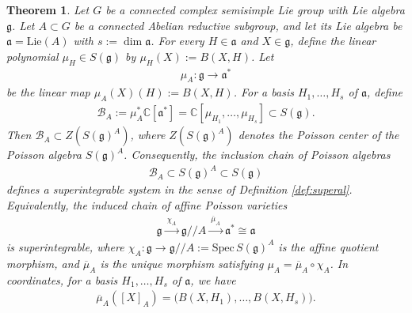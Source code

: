 \documentclass[11pt,reqno]{amsart}
\newtheorem*{theorem A}{Main Theorem A}
\newtheorem*{theorem B}{Main Theorem B}
\newtheorem*{theorem C}{Main Theorem C}
\newtheorem*{theorem D}{Main Theorem D}
\newtheorem{theorem}{Theorem}[section]
\theoremstyle{definition}
\theoremstyle{plain}
\theoremstyle{conclusion}
\begin{document}
\begin{theorem}
\label{thm:abelianredsuper}
Let $G$ be a connected complex semisimple Lie group with Lie algebra $\mathfrak{g}$. Let $A\subset G$ be a %
connected Abelian reductive subgroup, and let its Lie algebra be $\mathfrak{a}  = \mathrm{Lie}(A)$ with $s:=\dim \mathfrak{a}$.  %
For every $H\in\mathfrak{a}$ and $X \in \mathfrak{g}$, define the linear polynomial $\mu_H\in S(\mathfrak{g})$ by $\mu_H(X) := B(X,H)$. Let \begin{align*}
\mu_A:\mathfrak{g}\longrightarrow \mathfrak{a}^*
\end{align*} be the linear map $\mu_A(X)(H):= B(X,H)$. For a basis $H_1,\dots,H_s$ of $\mathfrak{a}$, define \begin{align*}
\mathcal{B}_A :=   \mu_A^*\mathbb{C}[\mathfrak{a}^*] = \mathbb{C}[\mu_{H_1},\dots,\mu_{H_s}] \subset S(\mathfrak{g}).
\end{align*} Then $\mathcal{B}_A\subset Z \left(S(\mathfrak{g})^A\right)$, where $Z(S(\mathfrak{g})^A)$ denotes the Poisson center of the Poisson algebra $S(\mathfrak{g})^A$. %
Consequently, the inclusion chain of Poisson algebras \begin{align*}
\mathcal{B}_A\subset S(\mathfrak{g})^A\subset S(\mathfrak{g})
\end{align*}
defines a superintegrable system in the sense of Definition \ref{def:superal}. Equivalently, the induced chain of affine Poisson varieties \begin{align*}
\mathfrak{g} \xrightarrow{\ \chi_A\ } \mathfrak{g}//A \xrightarrow{\ \overline{\mu}_A\ } \mathfrak{a}^* \cong \mathfrak{a}
\end{align*} is superintegrable, where $\chi_A:\mathfrak{g}\longrightarrow \mathfrak{g}//A:=\mathrm{Spec} \, S(\mathfrak{g})^A$ is the affine quotient morphism, and $\overline{\mu}_A$ is the unique morphism satisfying $\mu_A = \overline{\mu}_A \circ \chi_A$. In coordinates, for a basis $H_1,\dots,H_s$ of $\mathfrak{a}$, we have \begin{align*}
\overline{\mu}_A([X]_A) = \bigl( B(X,H_1),\dots,B(X,H_s)
\bigr).
\end{align*}
\end{theorem}
\end{document}
